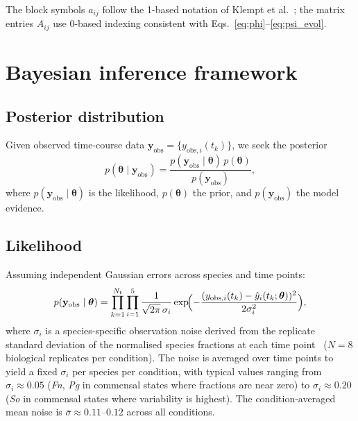 \documentclass[11pt,a4paper]{article}
\newcommand{\btheta}{\boldsymbol{\theta}}
\newcommand{\yobs}{\mathbf{y}_{\mathrm{obs}}}
\begin{document}
The block symbols $a_{ij}$ follow the 1-based notation of Klempt et al.~\cite{Klempt2025ContinuumBiofilm}; the matrix entries $A_{ij}$ use 0-based indexing consistent with Eqs.~\eqref{eq:phi}--\eqref{eq:psi_evol}.

\section{Bayesian inference framework}
\label{sec:bayes}

\subsection{Posterior distribution}

Given observed time-course data $\yobs = \{y_{\mathrm{obs},i}(t_k)\}$, we seek the posterior
\begin{equation}
p(\btheta\mid\yobs)
= \frac{p(\yobs\mid\btheta)\,p(\btheta)}{p(\yobs)},
\label{eq:bayes}
\end{equation}
where $p(\yobs\mid\btheta)$ is the likelihood, $p(\btheta)$ the prior, and $p(\yobs)$ the model evidence.

\subsection{Likelihood}

Assuming independent Gaussian errors across species and time points:
\begin{equation}
p(\yobs\mid\btheta)
= \prod_{k=1}^{N_t}\prod_{i=1}^{5}
\frac{1}{\sqrt{2\pi}\,\sigma_{i}}
\exp\!\Bigl(-\frac{(y_{\mathrm{obs},i}(t_k)-\hat{y}_i(t_k;\btheta))^2}{2\sigma_{i}^2}\Bigr),
\label{eq:likelihood}
\end{equation}
where $\sigma_{i}$ is a species-specific observation noise derived from the replicate standard deviation of the normalised species fractions at each time point~\cite{Heine2025PeriImplant} ($N=8$ biological replicates per condition).
The noise is averaged over time points to yield a fixed $\sigma_i$ per species per condition, with typical values ranging from $\sigma_i\approx0.05$ (\textit{Fn}, \textit{Pg} in commensal states where fractions are near zero) to $\sigma_i\approx0.20$ (\textit{So} in commensal states where variability is highest).
The condition-averaged mean noise is $\bar{\sigma}\approx0.11$--$0.12$ across all conditions.
\end{document}
